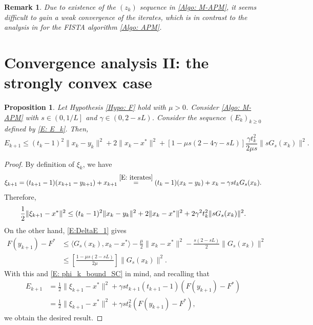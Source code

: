 \documentclass[pdflatex,sn-mathphys-num]{sn-jnl}
\theoremstyle{thmstyleone}
\newtheorem{proposition}[theorem]{Proposition}
\theoremstyle{thmstyletwo}
\newtheorem{remark}{Remark}
\theoremstyle{thmstylethree}
\begin{document}
\begin{remark}
Due to existence of the $(z_k)$ sequence in \eqref{Algo: M-APM}, it seems difficult to gain a weak convergence of the iterates, which is in contrast to the analysis in \cite{Ryu_2025,Radu_2025_iterate} for the FISTA algorithm \eqref{Algo: APM}.
\end{remark}




\section{Convergence analysis II: the strongly convex case}\label{Sec: strongly convex}

\begin{proposition} \label{Prop: Bound_Ek+1}
Let Hypothesis \ref{Hypo: F} hold with $\mu>0$. Consider \eqref{Algo: M-APM} with $s\in \left( 0, 1/L \right]$ and $\gamma\in(0,2-sL)$. Consider the sequence $(E_k)_{k\ge 0}$ defined by \eqref{E: E_k}. Then,
$$E_{k+1}
\le (t_k-1)^2 \| x_k-y_k \|^2 
 + 2 \| x_k-x^* \|^2 
 + \left[ 1- \mu s(2-4\gamma-sL) \right] \frac{\gamma t_k^2}{2\mu s} \| s G_s(x_k) \|^2.$$
\end{proposition}

\begin{proof}
By definition of $\xi_k$, we have
$$ \xi_{k+1} 
= (t_{k+1}-1)(x_{k+1}-y_{k+1}) + x_{k+1}
\stackrel{\eqref{E: iterates}}{=} (t_k-1)(x_k-y_k) + x_k - \gamma st_k G_s(x_k). $$
Therefore,
\begin{equation}\label{E: phi_k_bound_SC}
\frac{1}{2}\| \xi_{k+1} - x^* \|^2
\le (t_k-1)^2 \| x_k-y_k \|^2 
 + 2 \| x_k-x^* \|^2 \\
 + 2 \gamma^2 t_k^2 \| sG_s(x_k) \|^2.
\end{equation}
On the other hand, \eqref{E:DeltaE_1} gives
\begin{align*}
F(y_{k+1}) - F^* 
&\le \langle G_s(x_k), x_k-x^* \rangle - \frac{\mu}{2}\|x_k-x^* \|^2
    - \frac{s(2-sL)}{2}\| G_s(x_k) \|^2 \\
&\le \left[ \frac{1- \mu s(2-sL) }{2\mu} \right] \| G_s(x_k) \|^2.
\end{align*}
With this and \eqref{E: phi_k_bound_SC} in mind, and recalling that 
\begin{align*}
E_{k+1} 
&= \frac{1}{2}\| \xi_{k+1} - x^* \|^2 + \gamma s t_{k+1}(t_{k+1}-1)\left( F(y_{k+1}) - F^*\right) \\
&= \frac{1}{2}\| \xi_{k+1} - x^* \|^2 + \gamma s t_k^2 \left( F(y_{k+1}) - F^*\right),
\end{align*}
we obtain the desired result.
\end{proof}
\end{document}

